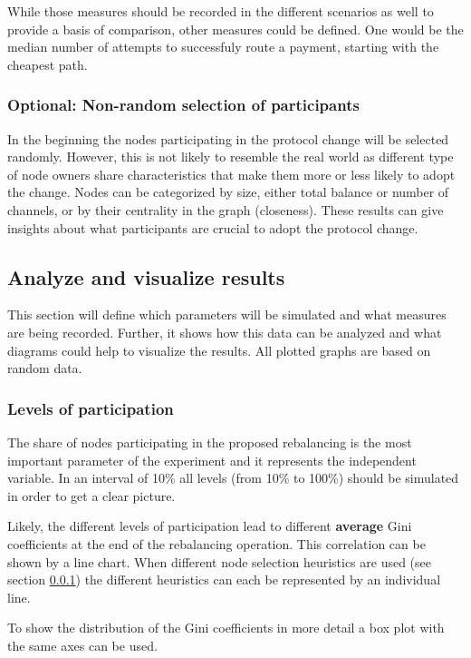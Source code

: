 \documentclass[final]{fhnwreport}       %
\begin{document}
While those measures should be recorded in the different scenarios as well to provide a basis of comparison, other measures could be defined. One would be the median number of attempts to successfuly route a payment, starting with the cheapest path.

\subsubsection{Optional: Non-random selection of participants}\label{sec:selpart}
In the beginning the nodes participating in the protocol change will be selected randomly. However, this is not likely to resemble the real world as different type of node owners share characteristics that make them more or less likely to adopt the change. Nodes can be categorized by size, either total balance or number of channels, or by their centrality in the graph (closeness). These results can give insights about what participants are crucial to adopt the protocol change. 

\subsection{Analyze and visualize results}\label{sec:o_anal}

This section will define which parameters will be simulated and what measures are being recorded. Further, it shows how this data can be analyzed and what diagrams could help to visualize the results. All plotted graphs are based on random data.

\subsubsection{Levels of participation}
The share of nodes participating in the proposed rebalancing is the most important parameter of the experiment and it represents the independent variable. In an interval of 10\% all levels (from 10\% to 100\%) should be simulated in order to get a clear picture.


Likely, the different levels of participation lead to different \textbf{average} Gini coefficients at the end of the rebalancing operation. This correlation can be shown by a line chart. When different node selection heuristics are used (see section \ref{sec:selpart}) the different heuristics can each be represented by an individual line. 

To show the distribution of the Gini coefficients in more detail a box plot with the same axes can be used.
\end{document}
